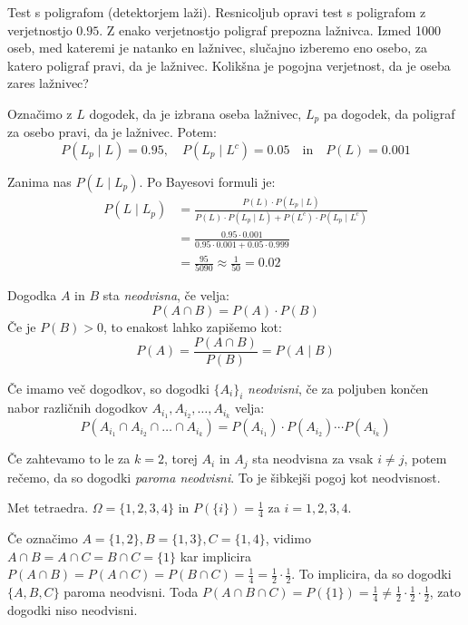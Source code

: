 \documentclass[12pt]{book}
\def\n{\noindent}
\theoremstyle{definition}
\theoremstyle{plain}
\theoremstyle{plain}
\theoremstyle{plain}
\theoremstyle{remark}
\begin{document}
\begin{zgled}
    Test s poligrafom (detektorjem laži). Resnicoljub opravi test s poligrafom z verjetnostjo $0.95$. Z enako verjetnostjo poligraf prepozna lažnivca. Izmed 1000 oseb, med kateremi je natanko en lažnivec, slučajno izberemo eno osebo, za katero poligraf pravi, da je lažnivec. Kolikšna je pogojna verjetnost, da je oseba zares lažnivec?

    Označimo z $L$ dogodek, da je izbrana oseba lažnivec, $L_p$ pa dogodek, da poligraf za osebo pravi, da je lažnivec. Potem:
    $$
    P\left(L_p \mid L\right)=0.95, \quad  P\left(L_p \mid L^c\right)=0.05 \quad \text{in} \quad P(L)=0.001
    $$

    \n Zanima nas $P\left(L \mid L_p\right)$. Po Bayesovi formuli je:
    $$
    \begin{aligned}
        P\left(L \mid L_p\right)&=\frac{P(L) \cdot P\left(L_p \mid L\right)}{P(L) \cdot P\left(L_p \mid L\right)+P\left(L^c\right) \cdot P\left(L_p \mid L^c\right)} \\
        &=\frac{0.95 \cdot 0.001}{0.95 \cdot 0.001+0.05 \cdot 0.999} \\
        &=\frac{95}{5090} \approx \frac{1}{50} = 0.02 
    \end{aligned}
    $$
\end{zgled}

\n Dogodka $A$ in $B$ sta \emph{neodvisna}, če velja: 
$$
P(A \cap B)=P(A) \cdot P(B)
$$
Če je $P(B)>0$, to enakost lahko zapišemo kot: 
$$
P(A)=\frac{P\left(A \cap B\right)}{P(B)}=P(A \mid B)
$$

\n Če imamo več dogodkov, so dogodki $\{ A_i \}_i$ \emph{neodvisni}, če za poljuben končen nabor različnih dogodkov $A_{i_1}, A_{i_2}, \ldots, A_{i_k}$ velja: 
$$
P\left(A_{i_1} \cap A_{i_2} \cap \ldots \cap A_{i_k}\right)=P\left(A_{i_1}\right) \cdot P\left(A_{i_2}\right) \cdots P\left(A_{i_k}\right)
$$

\n Če zahtevamo to le za $k=2$, torej $A_i$ in $A_j$ sta neodvisna za vsak $i \neq j$, potem rečemo, da so dogodki \emph{paroma neodvisni}. To je šibkejši pogoj kot neodvisnost. 

\begin{zgled}
    Met tetraedra. $\Omega=\{1,2,3,4\}$ in $P(\{i\})=\frac{1}{4}$ za $i = 1, 2, 3, 4$. 

    Če označimo $A=\{1,2\}, B=\{1,3\}, C=\{1,4\}$, vidimo $A \cap B=A \cap C=B \cap C=\{1\}$ kar implicira $P(A \cap B)=P(A \cap C)=P(B \cap C)=\frac{1}{4}=\frac{1}{2} \cdot \frac{1}{2}$. To implicira, da so dogodki $\{A, B, C\}$ paroma neodvisni. Toda $P(A \cap B \cap C)=P(\{1\})=\frac{1}{4} \neq \frac{1}{2} \cdot \frac{1}{2} \cdot \frac{1}{2}$, zato dogodki niso neodvisni. 
\end{zgled}
\end{document}
